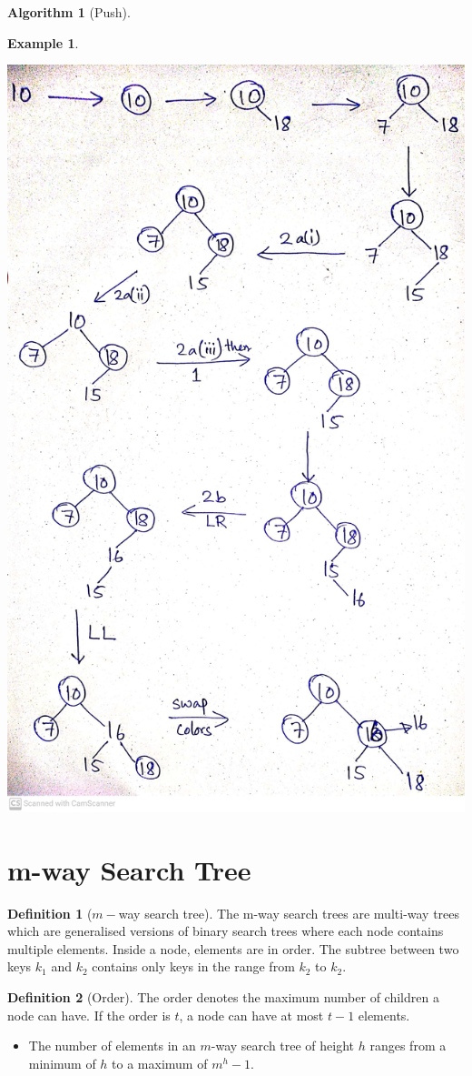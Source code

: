 \documentclass[10pt, a4paper]{extarticle}
\theoremstyle{definition}
\newtheorem{alg}{Algorithm}
\newtheorem{defn}{Definition}
\newtheorem{eg}{Example}
\begin{document}
\begin{alg}[Push]
\begin{eg}
\begin{center}
			\includegraphics[scale=0.08]{red-black.jpg}\\
		\end{center}
	\end{eg}

	\section{m-way Search Tree}
	\begin{defn}[$m-$way search tree]
		The m-way search trees are multi-way trees which are generalised versions of binary search trees where each node contains multiple elements. Inside a node, elements are in order. The subtree between two keys $k_1$ and $k_2$ contains only keys in the range from $k_2$ to $k_2$.
	\end{defn}
	\begin{defn}[Order]
		The order denotes the maximum number of children a node can have. If the order is $t$, a node can have at most $t-1$ elements.
	\end{defn}
	\begin{itemize}
\item The number of elements in an $m$-way search tree of height $h$ ranges from a minimum of $h$ to a maximum of $m^{h} -1$.


\end{itemize}
\end{alg}
\end{document}
